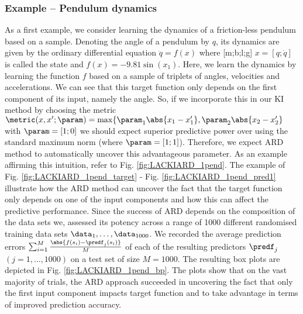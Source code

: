 \subsubsection{Example -- Pendulum dynamics}
As a first example, we consider learning the dynamics of a friction-less pendulum based on a sample. Denoting the angle of a pendulum by $q$,  its dynamics are given by the ordinary differential equation $\ddot q = f(x)$ where [m;b;l;g] 
$x = [q;\dot q]$ is called the state and 
$f(x) = - 9.81 \sin(x_1)$. Here, we learn the dynamics by learning the function $f$ based on a sample of triplets of angles, velocities and accelerations. We can see that this target function only depends on the first component of its input, namely the angle. So, if we incorporate this in our KI method by choosing the metric $\metric(x,x';\param) = \max\{\param_1 \abs{x_1-x_1'},\param_2\abs{x_2-x_2'}$ with $\param =[1; 0]$ we should expect superior predictive power over using the standard maximum norm (where $\param =[1; 1]$). 
Therefore, we expect ARD method to automatically uncover this advantageous parameter. As an 
example affirming this intuition, refer to Fig. \ref{fig:LACKIARD_1pend}.
The example of Fig. \ref{fig:LACKIARD_1pend_target} - Fig. \ref{fig:LACKIARD_1pend_pred1} illustrate how the ARD method can uncover the fact that the target function only depends on one of the input components and how this can affect the predictive performance. Since the success of ARD depends on the composition of the data sets we, assessed its potency across a range of 1000 different randomised training data sets $\data_1,\ldots,\data_{1000}$.  We recorded the average prediction errors $\sum_{i=1}^M \frac{\abs{f(s_i) - \predf_j(s_i) }}{M}$ of each of the resulting predictors $\predf_j$ $(j=1,\ldots,1000)$ on a test set of size $M=1000$. The resulting box plots are depicted in Fig. \ref{fig:LACKIARD_1pend_bp}. 
The plots show that on the vast majority of trials, the ARD approach succeeded in uncovering the fact that only the first input component impacts target function and to take advantage in terms of improved prediction accuracy.  




